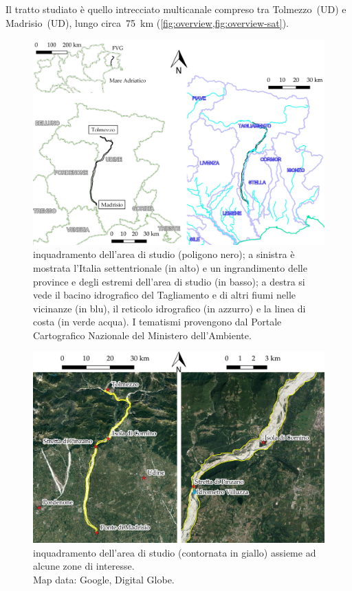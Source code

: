 Il tratto studiato è quello intrecciato multicanale compreso tra Tolmezzo~(UD) e Madrisio~(UD), lungo circa~\SI{75}{\kilo\m} (\cref{fig:overview,fig:overview-sat}). 
%
\begin{figure}
	\centering
	\includegraphics[width=\textwidth]{files/overview.jpeg}
	\caption[inquadramento dell'area di studio]
		{inquadramento dell'area di studio (poligono nero); a sinistra è mostrata l'Italia settentrionale (in alto) e un ingrandimento delle province e degli estremi dell'area di studio (in basso); a destra si vede il bacino idrografico del Tagliamento e di altri fiumi nelle vicinanze (in blu), il reticolo idrografico (in azzurro) e la linea di costa (in verde acqua). I tematismi provengono dal Portale Cartografico Nazionale del Ministero dell'Ambiente.}
	\label{fig:overview}
\end{figure}
%
\begin{figure}
	\centering
	\includegraphics[width=\textwidth]{files/overview_tratto_sat.jpeg}
	\caption[area di studio e zone di interesse]{inquadramento dell'area di studio (contornata in giallo) assieme ad alcune zone di interesse.
	\\
	Map data: Google, Digital Globe.}
	\label{fig:overview-sat}
\end{figure}
